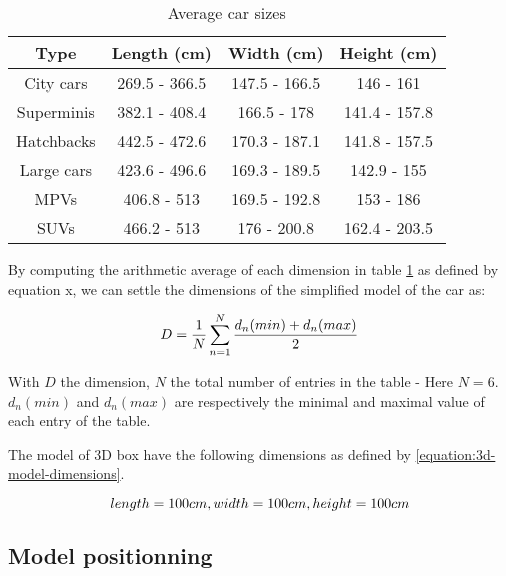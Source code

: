 \documentclass{scrartcl}
\begin{document}
    \begin{table}[!htbp]
      \centering
      \begin{tabular}{ | c | c | c | c |}
        \hline
        \textbf{Type} & \textbf{Length (cm)} & \textbf{Width (cm)} & 
        \textbf{Height (cm)}  \\
        \hline \hline
        City cars & 269.5 - 366.5 & 147.5 - 166.5 & 146 - 161 \\
        \hline
        Superminis & 382.1 - 408.4 & 166.5 - 178 & 141.4 - 157.8 \\
        \hline
        Hatchbacks & 442.5 - 472.6 & 170.3 - 187.1 & 141.8 - 157.5 \\
        \hline
        Large cars & 423.6 - 496.6 & 169.3 - 189.5 & 142.9 - 155 \\
        \hline
        MPVs & 406.8 - 513 & 169.5 - 192.8 & 153 - 186 \\
        \hline
        SUVs & 466.2 - 513 & 176 - 200.8 & 162.4 - 203.5 \\
        \hline
      \end{tabular}
      \caption{Average car sizes \cite{car-sizes}}
      \label{table:car-sizes}
    \end{table}

    By computing the arithmetic average of each dimension in table
    \ref{table:car-sizes} as defined by equation x, we can settle the
    dimensions of the simplified model of the car as:

    \begin{equation}
      \centering
      D = \frac{1}{N} \sum_{n=1}^{N}{\frac{d_n(min) + d_n(max)}{2}}
      \label{equation:average-size}
    \end{equation}

    With $D$ the dimension, $N$ the total number of entries in the table -
    Here $N = 6$. $d_n(min)$ and $d_n(max)$ are respectively the minimal and
    maximal value of each entry of the table.

    The model of 3D box have the following dimensions as defined by
    \ref{equation:3d-model-dimensions}.

    \begin{equation}
      \centering
      length = 100 cm, 
      width = 100 cm, 
      height = 100 cm
      \label{equation:3d-model-dimensions}
    \end{equation}

    \subsection{Model positionning}
\end{document}
